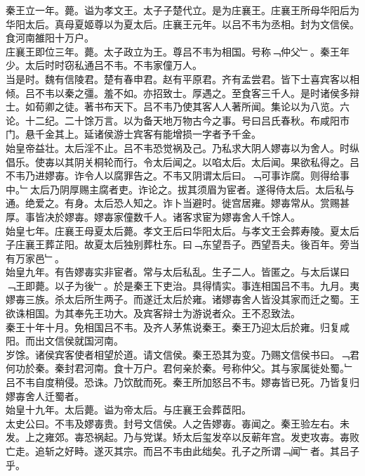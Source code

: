 \documentclass{zhvt-classic}
\begin{document}
\hspace*{2em}秦王立一年。薨。谥为孝文王。太子子楚代立。是为庄襄王。庄襄王所母华阳后为华阳太后。真母夏姬尊以为夏太后。庄襄王元年。以吕不韦为丞相。封为文信侯。食河南雒阳十万户。\\
\hspace*{2em}庄襄王即位三年。薨。太子政立为王。尊吕不韦为相国。号称﹁仲父﹂。秦王年少。太后时时窃私通吕不韦。不韦家僮万人。\\
\hspace*{2em}当是时。魏有信陵君。楚有春申君。赵有平原君。齐有孟尝君。皆下士喜宾客以相倾。吕不韦以秦之彊。羞不如。亦招致士。厚遇之。至食客三千人。是时诸侯多辩士。如荀卿之徒。著书布天下。吕不韦乃使其客人人著所闻。集论以为八览。六论。十二纪。二十馀万言。以为备天地万物古今之事。号曰吕氏春秋。布咸阳市门。悬千金其上。延诸侯游士宾客有能增损一字者予千金。\\
\hspace*{2em}始皇帝益壮。太后淫不止。吕不韦恐觉祸及己。乃私求大阴人嫪毐以为舍人。时纵倡乐。使毐以其阴关桐轮而行。令太后闻之。以啗太后。太后闻。果欲私得之。吕不韦乃进嫪毐。诈令人以腐罪告之。不韦又阴谓太后曰。﹁可事诈腐。则得给事中。﹂太后乃阴厚赐主腐者吏。诈论之。拔其须眉为宦者。遂得侍太后。太后私与通。绝爱之。有身。太后恐人知之。诈卜当避时。徙宫居雍。嫪毐常从。赏赐甚厚。事皆决於嫪毐。嫪毐家僮数千人。诸客求宦为嫪毐舍人千馀人。\\
\hspace*{2em}始皇七年。庄襄王母夏太后薨。孝文王后曰华阳太后。与孝文王会葬寿陵。夏太后子庄襄王葬芷阳。故夏太后独别葬杜东。曰﹁东望吾子。西望吾夫。後百年。旁当有万家邑﹂。\\
\hspace*{2em}始皇九年。有告嫪毐实非宦者。常与太后私乱。生子二人。皆匿之。与太后谋曰﹁王即薨。以子为後﹂。於是秦王下吏治。具得情实。事连相国吕不韦。九月。夷嫪毐三族。杀太后所生两子。而遂迁太后於雍。诸嫪毐舍人皆没其家而迁之蜀。王欲诛相国。为其奉先王功大。及宾客辩士为游说者众。王不忍致法。\\
\hspace*{2em}秦王十年十月。免相国吕不韦。及齐人茅焦说秦王。秦王乃迎太后於雍。归复咸阳。而出文信侯就国河南。\\
\hspace*{2em}岁馀。诸侯宾客使者相望於道。请文信侯。秦王恐其为变。乃赐文信侯书曰。﹁君何功於秦。秦封君河南。食十万户。君何亲於秦。号称仲父。其与家属徙处蜀。﹂吕不韦自度稍侵。恐诛。乃饮酖而死。秦王所加怒吕不韦。嫪毐皆已死。乃皆复归嫪毐舍人迁蜀者。\\
\hspace*{2em}始皇十九年。太后薨。谥为帝太后。与庄襄王会葬茝阳。\\
\hspace*{2em}太史公曰。不韦及嫪毐贵。封号文信侯。人之告嫪毐。毐闻之。秦王验左右。未发。上之雍郊。毐恐祸起。乃与党谋。矫太后玺发卒以反蕲年宫。发吏攻毐。毐败亡走。追斩之好畤。遂灭其宗。而吕不韦由此绌矣。孔子之所谓﹁闻﹂者。其吕子乎。\\
\end{document}
